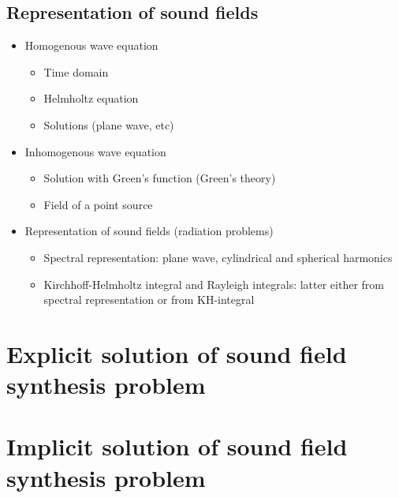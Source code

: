 \subsection{Representation of sound fields}

\begin{itemize}
\item Homogenous wave equation
	\begin{itemize}
	\item Time domain
	\item Helmholtz equation
	\item Solutions (plane wave, etc)
	\end{itemize}
\item Inhomogenous wave equation
\begin{itemize}
	\item Solution with Green's function (Green's theory)
	\item Field of a point source 
\end{itemize}
\item Representation of sound fields (radiation problems)
\begin{itemize}
	\item Spectral representation: plane wave, cylindrical and spherical harmonics
	\item Kirchhoff-Helmholtz integral and Rayleigh integrals: latter either from spectral representation or from KH-integral
\end{itemize}
\end{itemize}


\section{Explicit solution of sound field synthesis problem}

\section{Implicit solution of sound field synthesis problem}